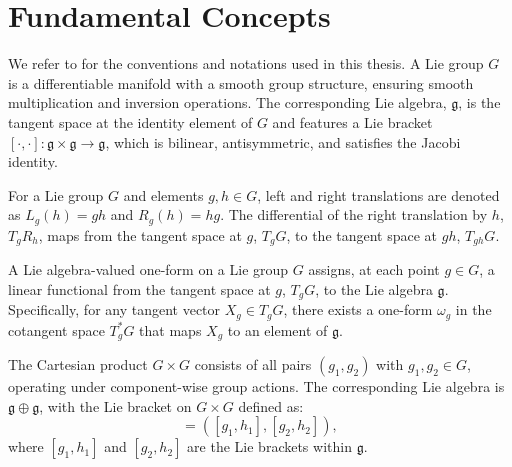 \section{Fundamental Concepts}
\label{sec:fundamental-concepts}

We refer to \cite{leeIntroductionSmoothManifolds2012} for the conventions and notations used in this thesis. A Lie group \(G\) is a differentiable manifold with a smooth group structure, ensuring smooth multiplication and inversion operations. The corresponding Lie algebra, \(\mathfrak{g}\), is the tangent space at the identity element of \(G\) and features a Lie bracket \([\cdot, \cdot] : \mathfrak{g} \times \mathfrak{g} \rightarrow \mathfrak{g}\), which is bilinear, antisymmetric, and satisfies the Jacobi identity.

For a Lie group \(G\) and elements \(g, h \in G\), left and right translations are denoted as \(L_g(h) = gh\) and \(R_g(h) = hg\). The differential of the right translation by \(h\), \(T_gR_h\), maps from the tangent space at \(g\), \(T_gG\), to the tangent space at \(gh\), \(T_{gh}G\).

A Lie algebra-valued one-form on a Lie group \(G\) assigns, at each point \(g \in G\), a linear functional from the tangent space at \(g\), \(T_gG\), to the Lie algebra \(\mathfrak{g}\). Specifically, for any tangent vector \(X_g \in T_gG\), there exists a one-form \(\omega_g\) in the cotangent space \(T^*_gG\) that maps \(X_g\) to an element of \(\mathfrak{g}\).

The Cartesian product \(G \times G\) consists of all pairs \((g_1, g_2)\) with \(g_1, g_2 \in G\), operating under component-wise group actions. The corresponding Lie algebra is \(\mathfrak{g} \oplus \mathfrak{g}\), with the Lie bracket on \(G \times G\) defined as:
\begin{equation}
    [(g_1, g_2), (h_1, h_2)] = ([g_1, h_1], [g_2, h_2]),
\end{equation}
where \([g_1, h_1]\) and \([g_2, h_2]\) are the Lie brackets within \(\mathfrak{g}\).